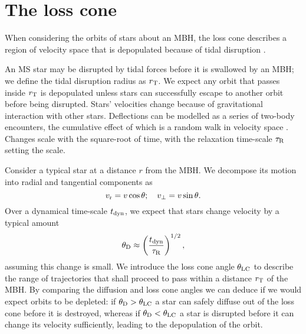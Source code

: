 \chapter{The loss cone}\label{ap:loss-cone}

When considering the orbits of stars about an MBH, the loss cone describes a region of velocity space that is depopulated because of tidal disruption \citep{Frank1976,Lightman1977,Merritt2013}.

An MS star may be disrupted by tidal forces before it is swallowed by an MBH; we define the tidal disruption radius as $r_\mathrm{T}$. We expect any orbit that passes inside $r_\mathrm{T}$ is depopulated unless stars can successfully escape to another orbit before being disrupted. Stars' velocities change because of gravitational interaction with other stars. Deflections can be modelled as a series of two-body encounters, the cumulative effect of which is a random walk in velocity space \citep[chapter 2]{Chandrasekhar1960}. Changes scale with the square-root of time, with the relaxation time-scale $\tau_\mathrm{R}$ setting the scale.

Consider a typical star at a distance $r$ from the MBH. We decompose its motion into radial and tangential components as
\begin{equation}
v_\mathrm{r} = v\cos \theta; \quad v_\perp = v\sin \theta.
\end{equation}
Over a dynamical time-scale $t_\mathrm{dyn}$, we expect that stars change velocity by a typical amount
\begin{equation}
\theta_\mathrm{D} \approx \left(\dfrac{t_\mathrm{dyn}}{\tau_\mathrm{R}}\right)^{1/2},
\end{equation}
assuming this change is small. We introduce the loss cone angle $\theta_\mathrm{LC}$ to describe the range of trajectories that shall proceed to pass within a distance $r_\mathrm{T}$ of the MBH. By comparing the diffusion and loss cone angles we can deduce if we would expect orbits to be depleted: if $\theta_\mathrm{D} > \theta_\mathrm{LC}$ a star can safely diffuse out of the loss cone before it is destroyed, whereas if $\theta_\mathrm{D} < \theta_\mathrm{LC}$ a star is disrupted before it can change its velocity sufficiently, leading to the depopulation of the orbit.

